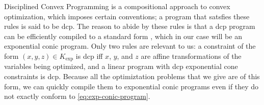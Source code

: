 \documentclass[twoside]{article}
\begin{document}
Disciplined Convex Programming \parencite{dcp-thesis} is a
compositional approach to convex optimization, which imposes certain conventions; 
a program that satsfies these rules is said to be dcp.
The reason to abide by these rules is that a dcp program can be efficiently compiled to a
standard form \parencite{agrawal2018rewriting}, 
which in our case will be an exponential conic program.
Only two rules are relevant to us: a constraint of the form
$(x,y,z) \in K_{\exp}$ is dcp iff $x$, $y$, and $z$ are affine transformations of the variables being optimized, 
and a linear program with dcp exponential cone constraints is dcp.
Because all the optimiztation problems that we give are
of this form,
we can quickly compile them
to exponential conic programs even if they do not exactly conform to \eqref{eq:exp-conic-program}.
\end{document}
